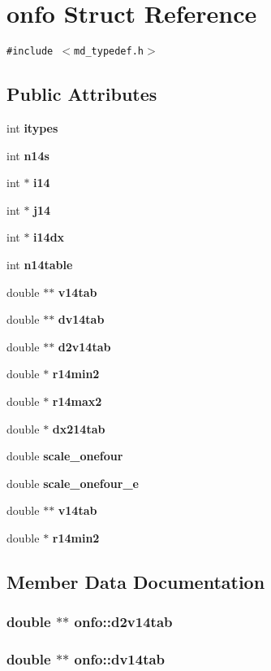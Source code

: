 \section{onfo Struct Reference}
\label{structonfo}
{\tt \#include $<$md\_\-typedef.h$>$}

\subsection*{Public Attributes}
\begin{CompactItemize}
\item 
int {\bf itypes}
\item 
int {\bf n14s}
\item 
int $\ast$ {\bf i14}
\item 
int $\ast$ {\bf j14}
\item 
int $\ast$ {\bf i14dx}
\item 
int {\bf n14table}
\item 
double $\ast$$\ast$ {\bf v14tab}
\item 
double $\ast$$\ast$ {\bf dv14tab}
\item 
double $\ast$$\ast$ {\bf d2v14tab}
\item 
double $\ast$ {\bf r14min2}
\item 
double $\ast$ {\bf r14max2}
\item 
double $\ast$ {\bf dx214tab}
\item 
double {\bf scale\_\-onefour}
\item 
double {\bf scale\_\-onefour\_\-e}
\item 
double $\ast$$\ast$ {\bf v14tab}
\item 
double $\ast$ {\bf r14min2}
\end{CompactItemize}


\subsection{Member Data Documentation}
\subsubsection{\setlength{\rightskip}{0pt plus 5cm}double $\ast$$\ast$ {\bf onfo::d2v14tab}}\label{structonfo_193b4fab6fb6d79fddf50d7fb2a16d0c}


\subsubsection{\setlength{\rightskip}{0pt plus 5cm}double $\ast$$\ast$ {\bf onfo::dv14tab}}\label{structonfo_9b22d15fa63572d9292d534a9276fb6c}


